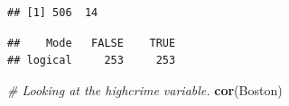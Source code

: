 \documentclass[
]{article}
\newenvironment{Shaded}{\begin{snugshade}}{\end{snugshade}}
\newcommand{\CommentTok}[1]{\textcolor[rgb]{0.56,0.35,0.01}{\textit{#1}}}
\newcommand{\KeywordTok}[1]{\textcolor[rgb]{0.13,0.29,0.53}{\textbf{#1}}}
\newcommand{\NormalTok}[1]{#1}
\newcommand{\OperatorTok}[1]{\textcolor[rgb]{0.81,0.36,0.00}{\textbf{#1}}}
\begin{document}
\begin{verbatim}
## [1] 506  14
\end{verbatim}

\begin{Shaded}
\end{Shaded}

\begin{verbatim}
##    Mode   FALSE    TRUE 
## logical     253     253
\end{verbatim}

\begin{Shaded}
\begin{Highlighting}[]
\CommentTok{# Looking at the highcrime variable.}
\KeywordTok{cor}\NormalTok{(Boston)}
\end{Highlighting}
\end{Shaded}
\end{document}
